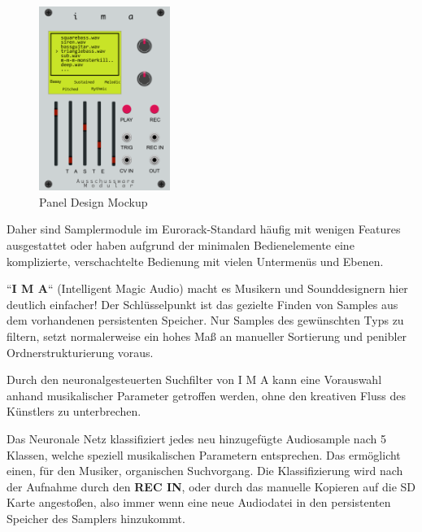 	\begin{figure} %
		\vspace{-20pt + 0.02\textwidth}
		\hspace{0.02\textwidth} %
		\includegraphics[width=0.38\textwidth]{images/02_detaillierte-projektbeschr/ima_mockup.png} %
		\caption{Panel Design Mockup }
		\label{fig:panel_mockup}
		\vspace{-20pt}
	\end{figure}

	Daher sind Samplermodule im Eurorack-Standard häufig mit wenigen Features ausgestattet oder haben aufgrund der minimalen Bedienelemente eine komplizierte, verschachtelte Bedienung mit vielen Untermenüs und Ebenen. 
	
	``\textbf{I M A}`` (Intelligent Magic Audio) macht es Musikern und Sounddesignern hier deutlich einfacher! Der Schlüsselpunkt ist das gezielte Finden von Samples aus dem vorhandenen persistenten Speicher. Nur Samples des gewünschten Typs zu filtern, setzt normalerweise ein hohes Maß an manueller Sortierung und penibler Ordnerstrukturierung voraus.
	
	Durch den neuronalgesteuerten Suchfilter von I M A kann eine Vorauswahl anhand musikalischer Parameter getroffen werden, ohne den kreativen Fluss des Künstlers zu unterbrechen.
	
	Das Neuronale Netz klassifiziert jedes neu hinzugefügte Audiosample nach 5 Klassen, welche speziell musikalischen Parametern entsprechen. Das ermöglicht einen, für den Musiker, organischen Suchvorgang.
	Die Klassifizierung wird nach der Aufnahme durch den \textbf{REC IN}, oder durch das manuelle Kopieren auf die SD Karte angestoßen, also immer wenn eine neue Audiodatei in den persistenten Speicher des Samplers hinzukommt.
	

